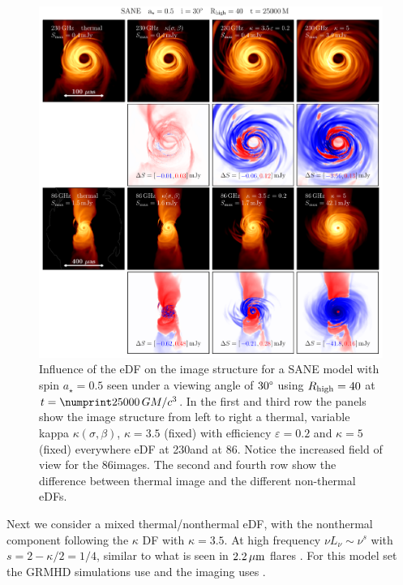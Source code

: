 \begin{figure}
  \centering
  \includegraphics[width=\textwidth]{./figures/SANE_eDFs_diff.pdf}
  \caption{Influence of the eDF on the image structure for a SANE model with spin $a_{\star}=0.5$ seen under a viewing angle of $30\degree$ using $R_\mathrm{high} = 40$ at $t = \no{25000}\,\tg$.
    In the first and third row the panels show the image structure from left to right a thermal, variable kappa $\kappa(\sigma,\beta)$, $\kappa=3.5$ (fixed) with efficiency $\varepsilon=0.2$ and $\kappa=5$ (fixed) everywhere eDF at 230\GHz and at 86\GHz.
    Notice the increased field of view for the 86\GHz images.
    The second and fourth row show the difference between thermal image and the different non-thermal eDFs.}
  \label{fig:SANE_edfs}
\end{figure}

Next we consider a mixed thermal/nonthermal eDF, with the nonthermal component following the $\kappa$ DF with $\kappa = 3.5$.
At high frequency $\nu L_\nu \sim \nu^s$ with $s = 2 - \kappa/2 = 1/4$, similar to what is seen in $2.2\,\mu\mathrm{m}$ flares \citep{2007ApJ...667..900H}.
For this model set the GRMHD simulations use \bhac and the imaging uses \bhoss.

